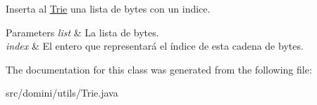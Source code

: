Inserta al \hyperlink{classdomini_1_1utils_1_1Trie}{Trie} una lista de bytes con un indice. 


\begin{DoxyParams}{Parameters}
{\em list} & La lista de bytes. \\
\hline
{\em index} & El entero que representará el índice de esta cadena de bytes. \\
\hline
\end{DoxyParams}


The documentation for this class was generated from the following file\+:\begin{DoxyCompactItemize}
\item 
src/domini/utils/Trie.\+java\end{DoxyCompactItemize}
